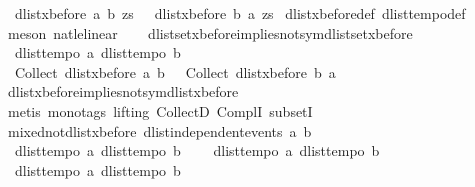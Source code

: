 \begin{isabellebody}
\ \ dlist{\isacharunderscore}xbefore\ a\ b\ zs\ {\isasymLongrightarrow}\ {\isasymnot}\ dlist{\isacharunderscore}xbefore\ b\ a\ zs{\isachardoublequoteclose}\isanewline
%
\isadelimproof
%
\endisadelimproof
%
\isatagproof
{}\isamarkupfalse%
\ dlist{\isacharunderscore}xbefore{\isacharunderscore}def\ dlist{\isacharunderscore}tempo{}{\isacharunderscore}def\ \isanewline
{}\isamarkupfalse%
\ {\isacharparenleft}meson\ nat{\isacharunderscore}le{\isacharunderscore}linear{\isacharparenright}%
\endisatagproof
{\isafoldproof}%
%
\isadelimproof
\isanewline
%
\endisadelimproof
\ \ \isanewline
{}\isamarkupfalse%
\ dlistset{\isacharunderscore}xbefore{\isacharunderscore}implies{\isacharunderscore}not{\isacharunderscore}sym{\isacharunderscore}dlistset{\isacharunderscore}xbefore{\isacharcolon}\isanewline
\ \ {\isachardoublequoteopen}{\isasymlbrakk}dlist{\isacharunderscore}tempo{}\ a{\isacharsemicolon}\ dlist{\isacharunderscore}tempo{}\ b{\isasymrbrakk}\ {\isasymLongrightarrow}\isanewline
\ \ Collect\ {\isacharparenleft}dlist{\isacharunderscore}xbefore\ a\ b{\isacharparenright}\ {\isasymsubseteq}\ {\isacharminus}\ Collect\ {\isacharparenleft}dlist{\isacharunderscore}xbefore\ b\ a{\isacharparenright}{\isachardoublequoteclose}\isanewline
%
\isadelimproof
%
\endisadelimproof
%
\isatagproof
{}\isamarkupfalse%
\ dlist{\isacharunderscore}xbefore{\isacharunderscore}implies{\isacharunderscore}not{\isacharunderscore}sym{\isacharunderscore}dlist{\isacharunderscore}xbefore\ \isanewline
{}\isamarkupfalse%
\ {\isacharparenleft}metis\ {\isacharparenleft}mono{\isacharunderscore}tags{\isacharcomma}\ lifting{\isacharparenright}\ CollectD\ ComplI\ subsetI{\isacharparenright}%
\endisatagproof
{\isafoldproof}%
%
\isadelimproof
\isanewline
%
\endisadelimproof
\isanewline
{}\isamarkupfalse%
\ mixed{\isacharunderscore}not{\isacharunderscore}dlist{\isacharunderscore}xbefore{\isacharcolon}\ {\isachardoublequoteopen}dlist{\isacharunderscore}independent{\isacharunderscore}events\ a\ b\ {\isasymLongrightarrow}\ \isanewline
\ \ {\isasymlbrakk}dlist{\isacharunderscore}tempo{}\ a{\isacharsemicolon}\ dlist{\isacharunderscore}tempo{}\ b{\isasymrbrakk}\ {\isasymLongrightarrow}\ \isanewline
\ \ {\isasymlbrakk}dlist{\isacharunderscore}tempo{}\ a{\isacharsemicolon}\ dlist{\isacharunderscore}tempo{}\ b{\isasymrbrakk}\ {\isasymLongrightarrow}\isanewline
\ \ {\isasymlbrakk}dlist{\isacharunderscore}tempo{}\ a{\isacharsemicolon}\ dlist{\isacharunderscore}tempo{}\ b{\isasymrbrakk}\ {\isasymLongrightarrow}\isanewline

\end{isabellebody}
